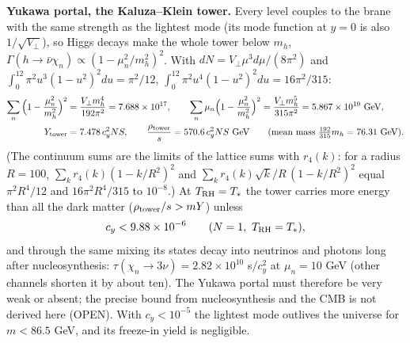 \documentclass[10pt,a4paper]{article}
\begin{document}
\textbf{Yukawa portal, the Kaluza–Klein tower.} Every level couples to the brane with the same strength as the lightest mode (its mode function at $y=0$ is also $1/\sqrt{V_\perp}$), so Higgs decays make the whole tower below $m_h$, $\Gamma(h\to\bar\nu\chi_n)\propto(1-\mu_n^2/m_h^2)^2$. With $dN=V_\perp\mu^3d\mu/(8\pi^2)$ and $\int_0^12\pi^2u^3(1-u^2)^2du=\pi^2/12$, $\int_0^12\pi^2u^4(1-u^2)^2du=16\pi^2/315$:
\begin{align*}
\sum_n\Big(1-\frac{\mu_n^2}{m_h^2}\Big)^2&=\frac{V_\perp m_h^4}{192\pi^2}=7.688\times10^{17},\qquad \sum_n\mu_n\Big(1-\frac{\mu_n^2}{m_h^2}\Big)^2=\frac{V_\perp m_h^5}{315\pi^2}=5.867\times10^{19}\ \text{GeV}, \\
Y_{\rm tower}&=7.478\,c_y^2NS,\qquad \frac{\rho_{\rm tower}}s=570.6\,c_y^2NS\ \text{GeV}\qquad(\text{mean mass }\tfrac{192}{315}m_h=76.31\ \text{GeV}).
\end{align*}
(The continuum sums are the limits of the lattice sums with $r_4(k)$: for a radius $R=100$, $\sum_kr_4(k)(1-k/R^2)^2$ and $\sum_kr_4(k)\sqrt k/R\,(1-k/R^2)^2$ equal $\pi^2R^4/12$ and $16\pi^2R^4/315$ to $10^{-8}$.) At $T_{\rm RH}=T_*$ the tower carries more energy than all the dark matter ($\rho_{\rm tower}/s>mY$) unless
\begin{equation*}
c_y<9.88\times10^{-6}\qquad(N=1,\ T_{\rm RH}=T_*),
\end{equation*}
and through the same mixing its states decay into neutrinos and photons long after nucleosynthesis: $\tau(\chi_n\to3\nu)=2.82\times10^{10}$ s$/c_y^2$ at $\mu_n=10$ GeV (other channels shorten it by about ten). The Yukawa portal must therefore be very weak or absent; the precise bound from nucleosynthesis and the CMB is not derived here (OPEN). With $c_y<10^{-5}$ the lightest mode outlives the universe for $m<86.5$ GeV, and its freeze-in yield is negligible.
\end{document}
